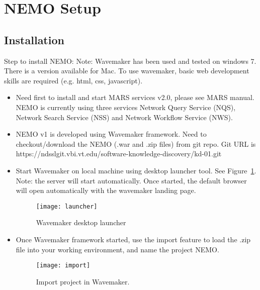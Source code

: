 \section{NEMO Setup}

\subsection{Installation}


Step to install NEMO:
Note: Wavemaker has been used and tested on windows 7. There is a version available for Mac. To use wavemaker, basic web development skills are required (e.g. html, css, javascript).
\begin{itemize}
\item Need first to install and start MARS services v2.0, please see MARS manual. NEMO is currently using three services Network Query Service (NQS), Network Search Service (NSS) and Network Workflow Service (NWS). 
\item NEMO v1 is developed using Wavemaker framework. Need to checkout/download the NEMO (.war and .zip files) from git repo. Git URL is https://ndsslgit.vbi.vt.edu/software-knowledge-discovery/kd-01.git
\item Start Wavemaker on local machine using desktop launcher tool. See Figure~\ref{fig:launcher}. Note: the server will start automatically. Once started, the default browser will open automatically with the wavemaker landing page.

\begin{figure}[H]
\centering
\texttt{[image: launcher]}
\caption{
Wavemaker desktop launcher
}   %
\label{fig:launcher}
\end{figure}

\item Once Wavemaker framework started, use the import feature to load the .zip file into your working environment, and name the project NEMO.

\begin{figure}[H]
\centering
\texttt{[image: import]}
\caption{
Import project in Wavemaker.
}   %
\label{fig:import}
\end{figure}

\end{itemize}

